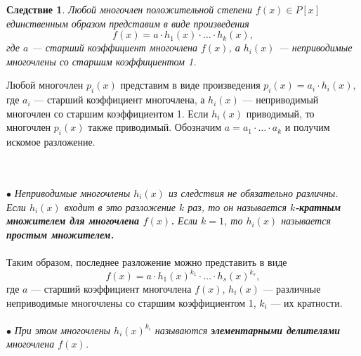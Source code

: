 \newtheorem*{852}{Следствие}\begin{852}
	Любой многочлен положительной степени $f(x) \in P[x]$ единственным образом представим в виде произведения $$f(x) = a\cdot h_1(x)\cdot \ldots \cdot h_k(x),$$ где $a$ --- старший коэффициент многочлена $f(x)$, а $h_i(x)$ --- неприводимые многочлены со 
	старшим коэффициентом 1. 
\end{852}	
\begin{Proof}
	Любой многочлен $p_i(x)$ представим в виде произведения $p_i(x) = a_i\cdot h_i(x)$, где $a_i$ --- старший коэффициент многочлена, а $h_i(x)$ --- неприводимый многочлен со старшим коэффициентом 1. Если $h_i(x)$ приводимый, то многочлен $p_i(x)$ также приводимый. Обозначим $a = a_1\cdot \ldots \cdot a_k$ и получим искомое разложение.
\end{Proof}\\\\
$\bullet$ \textit{Неприводимые многочлены $h_i(x)$ из следствия не обязательно различны. Если $h_i(x)$ входит в это разложение $k$ раз, то он называется \textbf{$k$-кратным множителем для многочлена $f(x)$.} Если $k = 1$, то $h_i(x)$ называется \textbf{простым множителем.}}\\\\
Таким образом, последнее разложение можно представить в виде $$f(x) = a\cdot h_1(x)^{k_1}\cdot \ldots \cdot  h_s(x)^{k_s},$$ где $a$ --- старший коэффициент многочлена $f(x)$, $h_i(x)$ --- различные неприводимые многочлены со старшим коэффициентом 1, $k_i$ --- их кратности. \\\\
$\bullet$ \textit{При этом многочлены $h_i(x)^{k_i}$ называются \textbf{элементарными делителями} многочлена $f(x)$.}



